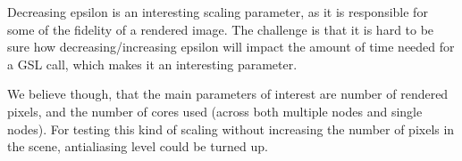 Decreasing epsilon is an interesting scaling parameter, as it is responsible for some of the fidelity of a rendered image. The challenge is that it is hard to be sure how decreasing/increasing epsilon will impact the amount of time needed for a GSL call, which makes it an interesting parameter.

We believe though, that the main parameters of interest are number of rendered pixels, and the number of cores used (across both multiple nodes and single nodes). For testing this kind of scaling without increasing the number of pixels in the scene, antialiasing level could be turned up.


